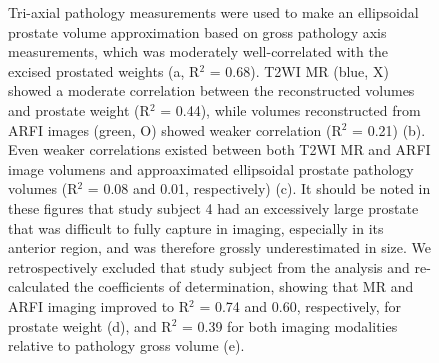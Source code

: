 \begin{figure}[htb!]
\begin{tabular}{ll}
\end{tabular}
\caption{Tri-axial pathology measurements were used to make an ellipsoidal
    prostate volume approximation based on gross pathology axis measurements,
    which was moderately well-correlated with the excised prostated weights (a,
    R$^2$ = 0.68).  T2WI MR (blue, X) showed a moderate correlation between the
    reconstructed volumes and prostate weight (R$^2$ = 0.44), while volumes
    reconstructed from ARFI images (green, O) showed weaker correlation (R$^2$
    = 0.21) (b).  Even weaker correlations existed between both T2WI MR and
    ARFI image volumens and approaximated ellipsoidal prostate pathology
    volumes (R$^2$ = 0.08 and 0.01, respectively) (c).  It should be noted in
    these figures that study subject 4 had an excessively large prostate that
    was difficult to fully capture in imaging, especially in its anterior
    region, and was therefore grossly underestimated in size.  We
    retrospectively excluded that study subject from the analysis and
    re-calculated the coefficients of determination, showing that MR and ARFI
    imaging improved to R$^2$ = 0.74 and 0.60, respectively, for prostate
    weight (d), and R$^2$ = 0.39 for both imaging modalities relative to
    pathology gross volume (e).}
\label{fig:mr_arfi_weight}
\end{figure}
